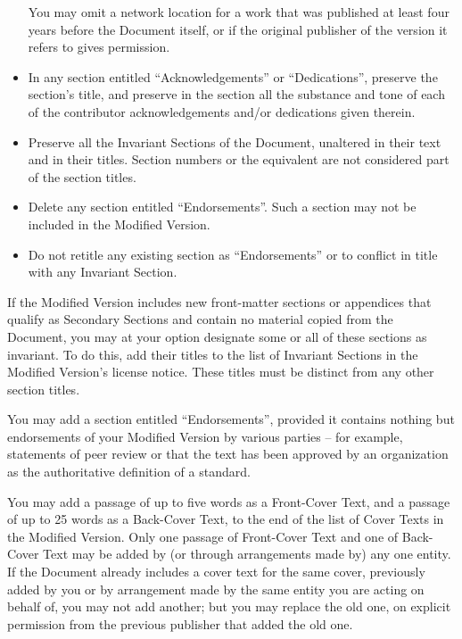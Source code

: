 \begin{itemize}
    You may omit a network location for a work that was published at
    least four years before the Document itself, or if the original
    publisher of the version it refers to gives permission.
    \item In any section entitled ``Acknowledgements'' or ``Dedications'',
    preserve the section's title, and preserve in the section all the
    substance and tone of each of the contributor acknowledgements
    and/or dedications given therein.
    \item Preserve all the Invariant Sections of the Document,
    unaltered in their text and in their titles.  Section numbers
    or the equivalent are not considered part of the section titles.
    \item Delete any section entitled ``Endorsements''.  Such a section
    may not be included in the Modified Version.
    \item Do not retitle any existing section as ``Endorsements''
    or to conflict in title with any Invariant Section.

    \end{itemize}

    If the Modified Version includes new front-matter sections or
    appendices that qualify as Secondary Sections and contain no material
    copied from the Document, you may at your option designate some or all
    of these sections as invariant.  To do this, add their titles to the
    list of Invariant Sections in the Modified Version's license notice.
    These titles must be distinct from any other section titles.

    You may add a section entitled ``Endorsements'', provided it contains
    nothing but endorsements of your Modified Version by various
    parties -- for example, statements of peer review or that the text has
    been approved by an organization as the authoritative definition of a
    standard.

    You may add a passage of up to five words as a Front-Cover Text, and a
    passage of up to 25 words as a Back-Cover Text, to the end of the list
    of Cover Texts in the Modified Version.  Only one passage of
    Front-Cover Text and one of Back-Cover Text may be added by (or
    through arrangements made by) any one entity.  If the Document already
    includes a cover text for the same cover, previously added by you or
    by arrangement made by the same entity you are acting on behalf of,
    you may not add another; but you may replace the old one, on explicit
    permission from the previous publisher that added the old one.

